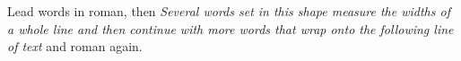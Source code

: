 \documentclass{article}
\begin{document}
Lead words in roman, then \textsl{Several words set in this shape measure the widths of a whole line and then continue with more words that wrap onto the following line of text} and roman again.
\end{document}
